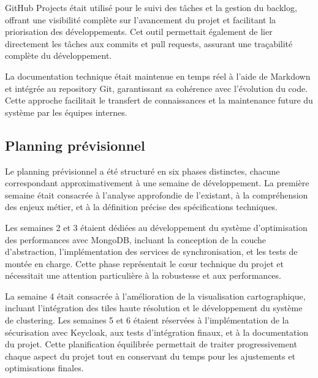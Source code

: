 GitHub Projects était utilisé pour le suivi des tâches et la gestion du backlog, offrant une visibilité complète sur l'avancement du projet et facilitant la priorisation des développements. Cet outil permettait également de lier directement les tâches aux commits et pull requests, assurant une traçabilité complète du développement.

La documentation technique était maintenue en temps réel à l'aide de Markdown et intégrée au repository Git, garantissant sa cohérence avec l'évolution du code. Cette approche facilitait le transfert de connaissances et la maintenance future du système par les équipes internes.

\subsection{Planning prévisionnel}

Le planning prévisionnel a été structuré en six phases distinctes, chacune correspondant approximativement à une semaine de développement. La première semaine était consacrée à l'analyse approfondie de l'existant, à la compréhension des enjeux métier, et à la définition précise des spécifications techniques.

Les semaines 2 et 3 étaient dédiées au développement du système d'optimisation des performances avec MongoDB, incluant la conception de la couche d'abstraction, l'implémentation des services de synchronisation, et les tests de montée en charge. Cette phase représentait le cœur technique du projet et nécessitait une attention particulière à la robustesse et aux performances.

La semaine 4 était consacrée à l'amélioration de la visualisation cartographique, incluant l'intégration des tiles haute résolution et le développement du système de clustering. Les semaines 5 et 6 étaient réservées à l'implémentation de la sécurisation avec Keycloak, aux tests d'intégration finaux, et à la documentation du projet. Cette planification équilibrée permettait de traiter progressivement chaque aspect du projet tout en conservant du temps pour les ajustements et optimisations finales.